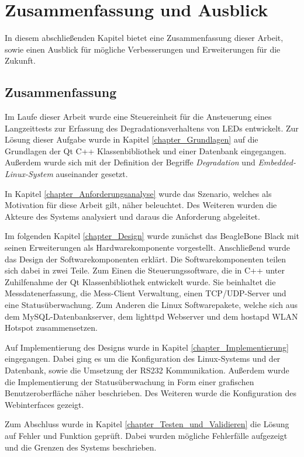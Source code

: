 \chapter{Zusammenfassung und Ausblick}
\label{chapter_FazitUndAusblick}

In diesem abschließenden Kapitel bietet eine Zusammenfassung dieser Arbeit, sowie einen Ausblick für mögliche Verbesserungen und Erweiterungen für die Zukunft.

\section{Zusammenfassung}
Im Laufe dieser Arbeit wurde eine Steuereinheit für die Ansteuerung eines Langzeittests zur Erfassung des Degradationsverhaltens von \acp{LED} entwickelt. Zur Lösung dieser Aufgabe wurde in Kapitel \ref{chapter_Grundlagen} auf die Grundlagen der Qt C++ Klassenbibliothek und einer Datenbank eingegangen. Außerdem wurde sich mit der Definition der Begriffe \textit{Degradation} und \textit{Embedded-Linux-System} auseinander gesetzt.\ 

In Kapitel \ref{chapter_Anforderungsanalyse} wurde das Szenario, welches als Motivation für diese Arbeit gilt, näher beleuchtet. Des Weiteren wurden die Akteure des Systems analysiert und daraus die Anforderung abgeleitet.\ 

Im folgenden Kapitel \ref{chapter_Design} wurde zunächst das BeagleBone Black mit seinen Erweiterungen als Hardwarekomponente vorgestellt. Anschließend wurde das Design der Softwarekomponenten erklärt. Die Softwarekomponenten teilen sich dabei in zwei Teile. Zum Einen die Steuerungssoftware, die in C++ unter Zuhilfenahme der Qt Klassenbibliothek entwickelt wurde. Sie beinhaltet die Messdatenerfassung, die Mess-Client Verwaltung, einen TCP/UDP-Server und eine Statusüberwachung. Zum Anderen die Linux Softwarepakete, welche sich aus dem MySQL-Datenbankserver, dem lighttpd Webserver und dem hostapd WLAN Hotspot zusammensetzen.\ 

Auf Implementierung des Designs wurde in Kapitel \ref{chapter_Implementierung} eingegangen. Dabei ging es um die Konfiguration des Linux-Systems und der Datenbank, sowie die Umsetzung der RS232 Kommunikation. Außerdem wurde die Implementierung der Statusüberwachung in Form einer grafischen Benutzeroberfläche näher beschrieben. Des Weiteren wurde die Konfiguration des Webinterfaces gezeigt.\ 

Zum Abschluss wurde in Kapitel \ref{chapter_Testen_und_Validieren} die Lösung auf Fehler und Funktion geprüft. Dabei wurden mögliche Fehlerfälle aufgezeigt und die Grenzen des Systems beschrieben.

